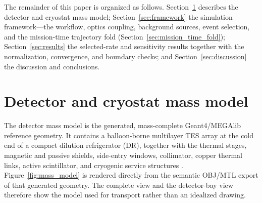 \documentclass[11pt]{article}
\begin{document}
The remainder of this paper is organized as follows. Section~\ref{sec:geometry} describes the detector and cryostat mass model; Section~\ref{sec:framework} the simulation framework---the workflow, optics coupling, background sources, event selection, and the mission-time trajectory fold (Section~\ref{sec:mission_time_fold}); Section~\ref{sec:results} the selected-rate and sensitivity results together with the normalization, convergence, and boundary checks; and Section~\ref{sec:discussion} the discussion and conclusions.

\section{Detector and cryostat mass model}
\label{sec:geometry}

The detector mass model is the generated, mass-complete Geant4/MEGAlib
reference geometry. It contains a balloon-borne multilayer TES array at the cold end of a
compact dilution refrigerator (DR), together with the thermal stages, magnetic
and passive shields, side-entry windows, collimator, copper thermal links,
active scintillator, and cryogenic service structures
\cite{Shirazi2023,Gottardi2021TESReview}. Figure~\ref{fig:mass_model} is rendered
directly from the semantic OBJ/MTL export of that generated geometry. The complete
view and the detector-bay view therefore show the model used for transport rather
than an idealized drawing.
\end{document}

